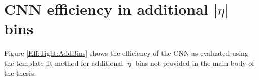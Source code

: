 \section{CNN efficiency in additional $|\eta|$ bins}
Figure \ref{Eff:Tight:AddBins} shows the efficiency of the CNN as evaluated using the template fit method for additional $|\eta|$ bins not provided in the main body of the thesis.
\begin{figure}[htbp]
    \centering
	  \\
	

\end{figure}
